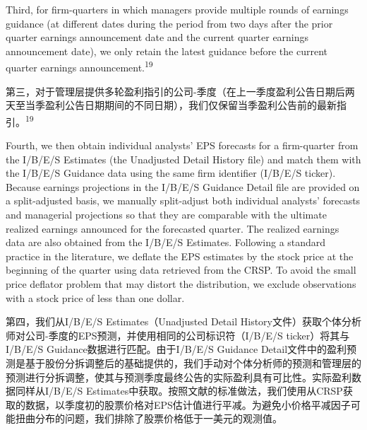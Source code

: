 \documentclass[12pt,a4paper]{article}
\newenvironment{original}
  {\par\medskip\noindent\ignorespaces}
  {\par\medskip}
\newenvironment{translation}
  {\par\noindent{\color{transblue}\ignorespaces}}
  {\par\bigskip}
\begin{document}
\begin{original}
Third, for firm-quarters in which managers provide multiple rounds of earnings guidance (at different dates during the period from two days after the prior quarter earnings announcement date and the current quarter earnings announcement date), we only retain the latest guidance before the current quarter earnings announcement.\textsuperscript{19}
\end{original}
\begin{translation}
第三，对于管理层提供多轮盈利指引的公司-季度（在上一季度盈利公告日期后两天至当季盈利公告日期期间的不同日期），我们仅保留当季盈利公告前的最新指引。\textsuperscript{19}
\end{translation}

\begin{original}
Fourth, we then obtain individual analysts' EPS forecasts for a firm-quarter from the I/B/E/S Estimates (the Unadjusted Detail History file) and match them with the I/B/E/S Guidance data using the same firm identifier (I/B/E/S ticker). Because earnings projections in the I/B/E/S Guidance Detail file are provided on a split-adjusted basis, we manually split-adjust both individual analysts' forecasts and managerial projections so that they are comparable with the ultimate realized earnings announced for the forecasted quarter. The realized earnings data are also obtained from the I/B/E/S Estimates. Following a standard practice in the literature, we deflate the EPS estimates by the stock price at the beginning of the quarter using data retrieved from the CRSP. To avoid the small price deflator problem that may distort the distribution, we exclude observations with a stock price of less than one dollar.
\end{original}
\begin{translation}
第四，我们从I/B/E/S Estimates（Unadjusted Detail History文件）获取个体分析师对公司-季度的EPS预测，并使用相同的公司标识符（I/B/E/S ticker）将其与I/B/E/S Guidance数据进行匹配。由于I/B/E/S Guidance Detail文件中的盈利预测是基于股份分拆调整后的基础提供的，我们手动对个体分析师的预测和管理层的预测进行分拆调整，使其与预测季度最终公告的实际盈利具有可比性。实际盈利数据同样从I/B/E/S Estimates中获取。按照文献的标准做法，我们使用从CRSP获取的数据，以季度初的股票价格对EPS估计值进行平减。为避免小价格平减因子可能扭曲分布的问题，我们排除了股票价格低于一美元的观测值。
\end{translation}
\end{document}
